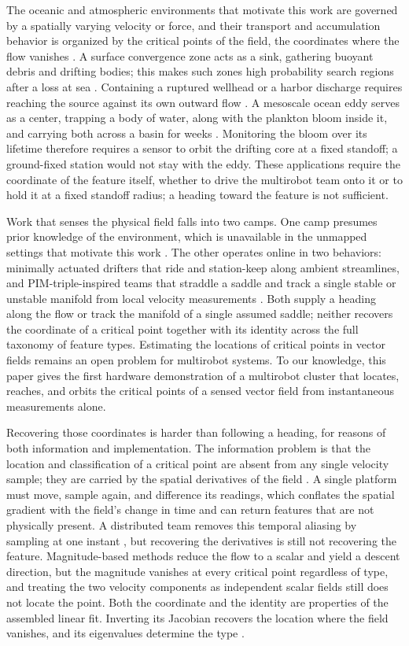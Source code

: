 \documentclass[lettersize,journal]{IEEEtran}
\begin{document}
The oceanic and atmospheric environments that motivate this work are governed by a spatially varying velocity or force, and their transport and accumulation behavior is organized by the critical points of the field, the coordinates where the flow vanishes \cite{32,36}. A surface convergence zone acts as a sink, gathering buoyant debris and drifting bodies; this makes such zones high probability search regions after a loss at sea \cite{37,38}. Containing a ruptured wellhead or a harbor discharge requires reaching the source against its own outward flow \cite{40,41}. A mesoscale ocean eddy serves as a center, trapping a body of water, along with the plankton bloom inside it, and carrying both across a basin for weeks \cite{43,44,45}. Monitoring the bloom over its lifetime therefore requires a sensor to orbit the drifting core at a fixed standoff; a ground-fixed station would not stay with the eddy. These applications require the coordinate of the feature itself, whether to drive the multirobot team onto it or to hold it at a fixed standoff radius; a heading toward the feature is not sufficient.

Work that senses the physical field falls into two camps. One camp presumes prior knowledge of the environment, which is unavailable in the unmapped settings that motivate this work \cite{30,31}. The other operates online in two behaviors: minimally actuated drifters that ride and station-keep along ambient streamlines, and PIM-triple-inspired teams that straddle a saddle and track a single stable or unstable manifold from local velocity measurements \cite{23,32,33}. Both supply a heading along the flow or track the manifold of a single assumed saddle; neither recovers the coordinate of a critical point together with its identity across the full taxonomy of feature types. Estimating the locations of critical points in vector fields remains an open problem for multirobot systems. To our knowledge, this paper gives the first hardware demonstration of a multirobot cluster that locates, reaches, and orbits the critical points of a sensed vector field from instantaneous measurements alone.

Recovering those coordinates is harder than following a heading, for reasons of both information and implementation. The information problem is that the location and classification of a critical point are absent from any single velocity sample; they are carried by the spatial derivatives of the field \cite{46}. A single platform must move, sample again, and difference its readings, which conflates the spatial gradient with the field's change in time and can return features that are not physically present. A distributed team removes this temporal aliasing by sampling at one instant \cite{22,23,47}, but recovering the derivatives is still not recovering the feature. Magnitude-based methods \cite{48} reduce the flow to a scalar and yield a descent direction, but the magnitude vanishes at every critical point regardless of type, and treating the two velocity components as independent scalar fields still does not locate the point. Both the coordinate and the identity are properties of the assembled linear fit. Inverting its Jacobian recovers the location where the field vanishes, and its eigenvalues determine the type \cite{36}.
\end{document}
